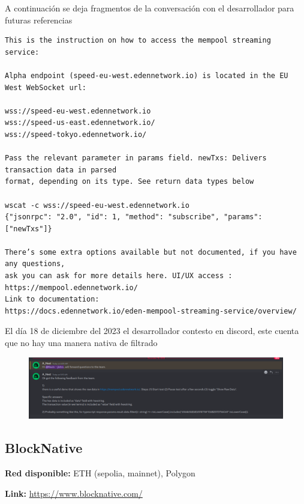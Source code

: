 A continuación se deja fragmentos de la conversación con el desarrollador para futuras referencias 
\begin{verbatim}
This is the instruction on how to access the mempool streaming service: 

Alpha endpoint (speed-eu-west.edennetwork.io) is located in the EU West WebSocket url: 

wss://speed-eu-west.edennetwork.io 
wss://speed-us-east.edennetwork.io/ 
wss://speed-tokyo.edennetwork.io/ 

Pass the relevant parameter in params field. newTxs: Delivers transaction data in parsed 
format, depending on its type. See return data types below 

wscat -c wss://speed-eu-west.edennetwork.io 
{"jsonrpc": "2.0", "id": 1, "method": "subscribe", "params": ["newTxs"]} 

There’s some extra options available but not documented, if you have any questions, 
ask you can ask for more details here. UI/UX access : https://mempool.edennetwork.io/ 
Link to documentation:
https://docs.edennetwork.io/eden-mempool-streaming-service/overview/
\end{verbatim}
El día 18 de diciembre del 2023 el desarrollador contesto en discord, este cuenta que no hay una manera nativa de filtrado 
\begin{figure}
    \centering
    \includegraphics[width=1\linewidth]{img//screenshots/Screenshot from 2023-12-18 13-01-00.png}
\end{figure}

\clearpage
\subsection{BlockNative}

\textbf{Red disponible:} ETH (sepolia, mainnet), Polygon

\textbf{Link:} \url{https://www.blocknative.com/}

\medskip

